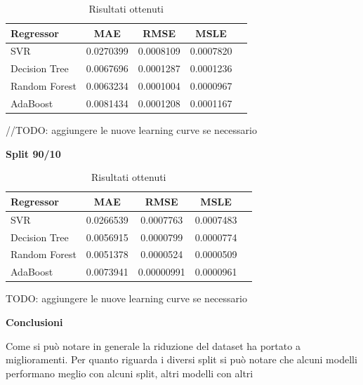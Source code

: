 \begin{table}[H]
    \centering
    \begin{tabular}{|>{\centering\arraybackslash}m{5cm}|c|c|c|c|}
        \hline
        \textbf{Regressor} & \textbf{MAE} & \textbf{RMSE} & \textbf{MSLE} \\ [10pt]
        \hline
        SVR & 0.0270399 & 0.0008109 & 0.0007820 \\ [10pt]
        \hline
        Decision Tree & 0.0067696 & 0.0001287 & 0.0001236 \\ [10pt]
        \hline
        Random Forest & 0.0063234 & 0.0001004 & 0.0000967 \\ [10pt]
        \hline
        AdaBoost & 0.0081434 & 0.0001208 & 0.0001167 \\ [10pt]
        \hline
    \end{tabular}
    \caption*{Risultati ottenuti}
    \label{tab:results}
\end{table}

//TODO: aggiungere le nuove learning curve se necessario



\textbf{Split 90/10}


\begin{table}[H]
    \centering
    \begin{tabular}{|>{\centering\arraybackslash}m{5cm}|c|c|c|c|}
        \hline
        \textbf{Regressor} & \textbf{MAE} & \textbf{RMSE} & \textbf{MSLE} \\ [10pt]
        \hline
        SVR & 0.0266539 & 0.0007763 & 0.0007483 \\ [10pt]
        \hline
        Decision Tree & 0.0056915 & 0.0000799 & 0.0000774 \\ [10pt]
        \hline
        Random Forest & 0.0051378 & 0.0000524 & 0.0000509 \\ [10pt]
        \hline
        AdaBoost & 0.0073941 & 0.00000991 & 0.0000961 \\ [10pt]
        \hline
    \end{tabular}
    \caption*{Risultati ottenuti}
    \label{tab:results}
\end{table}


TODO: aggiungere le nuove learning curve se necessario



\textbf{Conclusioni}

Come si può notare in generale la riduzione del dataset ha portato a miglioramenti. Per quanto riguarda i diversi split si può notare che alcuni modelli performano meglio con alcuni split, altri modelli con altri


